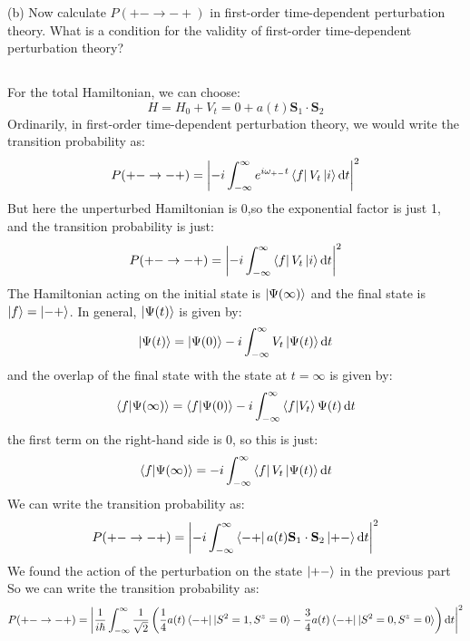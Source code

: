 \documentclass[12pt]{article}
\begin{document}
(b) Now calculate $P(+-\rightarrow-+)$ in first-order time-dependent perturbation theory. What is a condition for the validity of first-order time-dependent perturbation theory?
\subsection{}
For the total Hamiltonian, we can choose:
\begin{equation}
  H = H_0 + V_t = 0 + a(t) \mathbf{S}_1 \cdot \mathbf{S}_2
\end{equation}
Ordinarily, in first-order time-dependent perturbation theory, we would write the transition probability as:
\begin{equation}
  P(+-\rightarrow-+) = \abs{-i\int_{-\infty}^{\infty} e^{i\omega_{+-}t}\bra{f}V_t\ket{i}\dd{t}}^2
\end{equation}
But here the unperturbed Hamiltonian is 0,so the exponential factor is just 1, and the transition probability is just:
\begin{equation}
  P(+-\rightarrow-+) = \abs{-i\int_{-\infty}^{\infty} \bra{f}V_t\ket{i}\dd{t}}^2
\end{equation}
The Hamiltonian acting on the initial state is $\ket{\Psi (\infty)}$ and the final state is $\ket{f} = \ket{-+}$.
In general, $\ket{\Psi (t)}$ is given by:
\begin{equation}
  \ket{\Psi (t)} = \ket{\Psi (0)} - i\int_{-\infty}^{\infty} V_t\ket{\Psi (t)}\dd{t}
\end{equation}
and the overlap of the final state with the state at $t=\infty$ is given by:
\begin{equation}
  \braket{f}{\Psi (\infty)} = \braket{f}{\Psi (0)} - i\int_{-\infty}^{\infty} \braket{f}{V_t}{\Psi (t)}\dd{t}
\end{equation}
the first term on the right-hand side is 0, so this is just:
\begin{equation}
  \braket{f}{\Psi (\infty)} = -i\int_{-\infty}^{\infty} \bra{f}V_t\ket{\Psi (t)}\dd{t}
\end{equation}
 We can write the transition probability as:
\begin{equation}
  P(+-\rightarrow-+) = \abs{-i\int_{-\infty}^{\infty} \bra{-+}a(t) \mathbf{S}_1 \cdot \mathbf{S}_2\ket{+-}\dd{t}}^2
\end{equation}
We found the action of the perturbation on the state $\ket{+-}$ in the previous part 
So we can write the transition probability as:
\begin{equation}
  P(+-\rightarrow-+) = \abs{\frac{1}{i\hbar}\int_{-\infty}^{\infty} \frac{1}{\sqrt{2}}\left(\frac{1}{4}a(t)\bra{-+}|S^2 = 1, S^z = 0\rangle - \frac{3}{4}a(t)\bra{-+}|S^2 = 0, S^z = 0\rangle\right)\dd{t}}^2
\end{equation}
\end{document}
